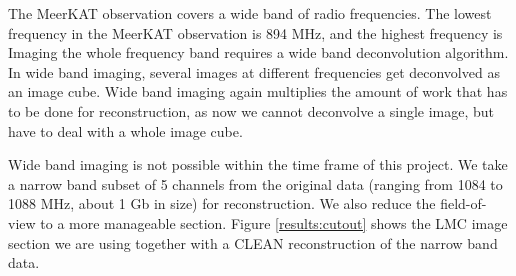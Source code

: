 The MeerKAT observation covers a wide band of radio frequencies. The lowest frequency in the MeerKAT observation is 894 MHz, and the highest frequency is
Imaging the whole frequency band requires a wide band deconvolution algorithm. In wide band imaging, several images at different frequencies get deconvolved as an image cube. Wide band imaging again multiplies the amount of work that has to be done for reconstruction, as now we cannot deconvolve a single image, but have to deal with a whole image cube.

Wide band imaging is not possible within the time frame of this project. We take a narrow band subset of 5 channels from the original data (ranging from 1084 to 1088 MHz, about 1 Gb in size) for reconstruction. We also reduce the field-of-view to a more manageable section. Figure \ref{results:cutout} shows the LMC image section we are using together with a CLEAN reconstruction of the narrow band data.


